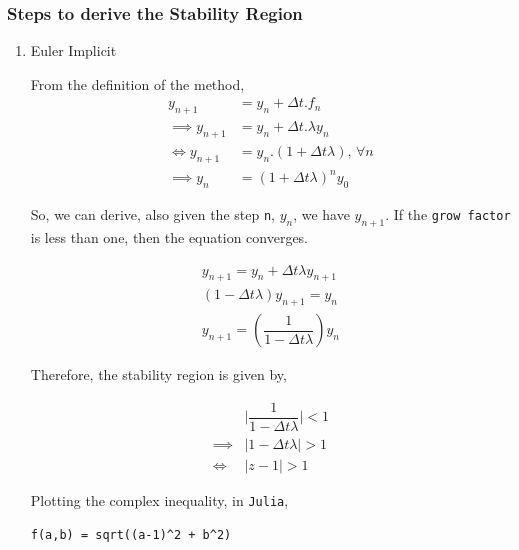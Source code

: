 \documentclass[11pt]{article}
\begin{document}
\subsubsection{Steps to derive the Stability Region}
\label{sec:orgd820d0a}
\begin{enumerate}
\item Euler Implicit
\label{sec:org72a0931}

From the definition of the method,
\begin{equation}
\begin{aligned}
y_{n+1}&= y_n + \Delta{t}.f_n\\
\implies y_{n+1} &= y_{n} + \Delta{t}.\lambda{} y_{n}\\
\Leftrightarrow y_{n+1} &= y_{n}.(1+ \Delta{t}\lambda{}), \, \forall{n}\\
\implies y_n &= \left(1+ \Delta{t}\lambda{}\right)^n y_0
\end{aligned}
\end{equation}

So, we can derive, also given the step \texttt{n}, \(y_n\), we have \(y_{n+1}\). If the
\texttt{grow factor} is less than one, then the equation converges.

\begin{equation}
\begin{aligned}
y_{n+1} = y_n + \Delta{t}\lambda y_{n+1}\\
(1 - \Delta{t}\lambda{})y_{n+1} = y_n\\
y_{n+1} = \left(\dfrac{1}{1- \Delta{t} \lambda}\right) y_n
\end{aligned}
\end{equation}

Therefore, the stability region is given by,

\begin{equation}
\begin{aligned}
& \biggr\rvert\dfrac{1}{1- \Delta{t} \lambda} \biggr\rvert < 1 \\
\implies & |1 - \Delta{t} \lambda{}| > 1 \\
\Leftrightarrow & |z - 1| > 1
\end{aligned}
\end{equation}


Plotting the complex inequality, in \texttt{Julia},
\begin{verbatim}
f(a,b) = sqrt((a-1)^2 + b^2)
\end{verbatim}


\end{enumerate}
\end{document}
